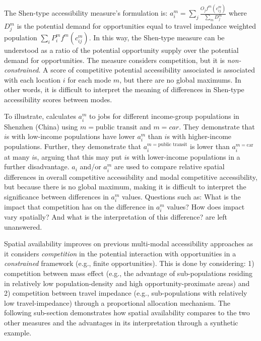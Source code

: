 \documentclass[numbered]{trbunofficial}
\begin{document}
The Shen-type accessibility measure's formulation is:
\(a_i^m = \sum_j \frac{O_jf^m(c_{ij}^m)}{\sum_m D_j^m}\) where \(D_j^m\)
is the potential demand for opportunities equal to travel impedance
weighted population \(\sum_i P_i^m f^m(c_{ij}^m)\). In this way, the
Shen-type measure can be understood as a ratio of the potential
opportunity supply over the potential demand for opportunities. The
measure considers competition, but it is \emph{non-constrained}. A score
of competitive potential accessibility associated is associated with
each location \(i\) for each mode \(m\), but there are no global
maximums. In other words, it is difficult to interpret the meaning of
differences in Shen-type accessibility scores between modes.

To illustrate, \citet{taoInvestigatingImpactsPublic2020a} calculates
\(a_i^m\) to jobs for different income-group populations in Shenzhen
(China) using \(m = \text{public transit}\) and \(m={car}\). They
demonstrate that \(i\)s with low-income populations have lower \(a_i^m\)
than \(i\)s with higher-income populations. Further, they demonstrate
that \(a_i^{m=\text{public transit}}\) is lower than
\(a_i^{m=\text{car}}\) at many \(i\)s, arguing that this may put \(i\)s
with lower-income populations in a further disadvantage. \(a_i\) and/or
\(a_i^m\) are used to compare relative spatial differences in overall
competitive accessibility and modal competitive accessibility, but
because there is no global maximum, making it is difficult to interpret
the significance between differences in \(a_i^{m}\) values. Questions
such as: What is the impact that competition has on the difference in
\(a_i^m\) values? How does impact vary spatially? And what is the
interpretation of this difference? are left unanswered.

Spatial availability improves on previous multi-modal accessibility
approaches as it considers \emph{competition} in the potential
interaction with opportunities in a \emph{constrained} framework (e.g.,
finite opportunities). This is done by considering: 1) competition
between mass effect (e.g., the advantage of sub-populations residing in
relatively low population-density and high opportunity-proximate areas)
and 2) competition between travel impedance (e.g., sub-populations with
relatively low travel-impedance) through a proportional allocation
mechanism. The following sub-section demonstrates how spatial
availability compares to the two other measures and the advantages in
its interpretation through a synthetic example.
\end{document}

